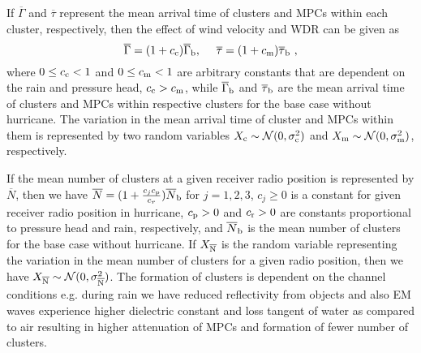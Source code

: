 \documentclass[conference]{IEEEtran}
\begin{document}
If $\overline\Gamma$ and $\overline\tau$ represent the mean arrival time of clusters and MPCs within each cluster, respectively, then the effect of wind velocity and WDR can be given as
\begin{equation}   
\overline\Gamma = (1 + c_{\rm c})\overline\Gamma_{\rm b},  \ \ \ \  \overline\tau  = (1 + c_{\rm m})\overline\tau_{\rm b} \ ,  \label{Eq:TOA_rain_wind}
\end{equation}
where $0\leq c_{\rm c}<1$ and $0\leq c_{\rm m}<1$ are arbitrary constants that are dependent on the rain and pressure head, $c_{\rm c}>c_{\rm m}$, while $\overline\Gamma_{\rm b}$ and $\overline\tau_{\rm b}$ are the mean arrival time of clusters and MPCs within respective clusters for the base case without hurricane. The variation in the mean arrival time of cluster and MPCs within them is represented by two random variables $X_{\rm c}\sim\mathcal{N}(0,\sigma_{\rm c}^2)$ and $X_{\rm m}\sim\mathcal{N}(0,\sigma_{\rm m}^2)$, respectively. 

 If the mean number of clusters at a given receiver radio position is represented by $\overline N$, then we have $\overline N = (1+\frac{c_{j}c_{\rm p}}{c_{r}}) \overline N_{\rm b} $ for $j=1,2,3$, $c_{j}\geq0$ is a constant for given receiver radio position in hurricane, $c_{\rm p}>0$ and $c_{\rm r}>0$ are constants proportional to pressure head and rain, respectively, and $\overline N_{\rm b}$ is the mean number of clusters for the base case without hurricane. If $X_{\rm \overline N}$ is the random variable representing the variation in the mean number of clusters for a given radio position, then we have $X_{\rm \overline N}\sim\mathcal{N}(0,\sigma_{\rm \overline N}^2)$. The formation of clusters is dependent on the channel conditions e.g. during rain we have reduced reflectivity from objects and also EM waves experience higher dielectric constant and loss tangent of water as compared to air resulting in higher attenuation of MPCs and formation of fewer number of clusters.  

\end{document}
